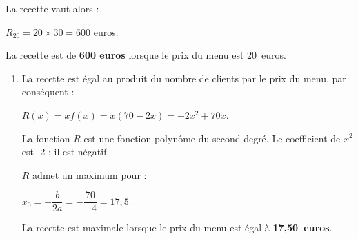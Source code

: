 \begin{corrige}
\begin{enumerate}
          \par
          La recette vaut alors :
          \par
          $R_{20}=20 \times 30 = 600$ euros.
          \par
          La recette est de \textbf{600 euros} lorsque le prix du menu est 20~euros.
          \par
     \end{enumerate}
     \par
     \par
     \begin{enumerate}
          \item %
          La recette est égal au produit du nombre de clients par le prix du menu, par conséquent :
          \par
          $R(x)=xf(x)=x(70-2x)$\nosp$=-2x^2+70x$.
          \par
          La fonction $R$ est une fonction polynôme du second degré. Le coefficient de $x^2$ est -2 ; il est négatif.
          \par
          $R$ admet un maximum pour :
          \par
          $x_0=-\dfrac{b}{2a}=-\dfrac{70}{-4}=17,5$.
          \par
          \vspace{2mm}
          La recette est maximale lorsque le prix du menu est égal à \textbf{17,50~euros}.
\end{enumerate}
\end{corrige}
